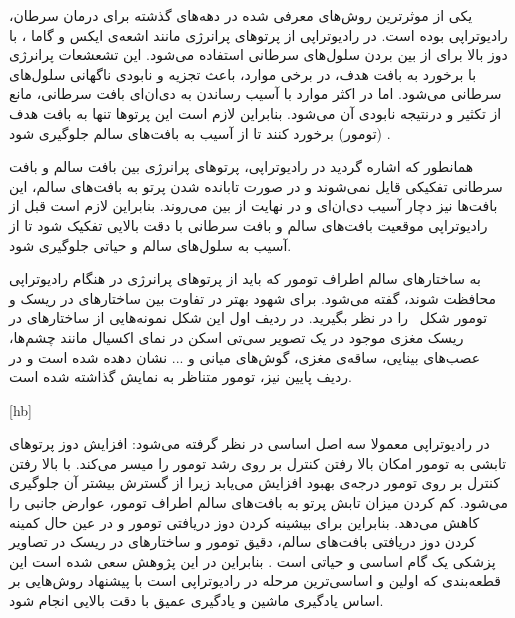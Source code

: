 

یکی از موثرترین روش‌های معرفی شده در دهه‌های گذشته برای درمان سرطان، رادیوتراپی	 بوده است. در رادیوتراپی از پرتوهای پرانرژی مانند اشعه‌ی ایکس	 و گاما	، با دوز	 بالا برای از بین بردن سلول‌های سرطانی استفاده می‌شود. این تشعشعات پرانرژی با برخورد به بافت هدف، در برخی موارد، باعث تجزیه و نابودی ناگهانی سلول‌های سرطانی می‌شود. اما در اکثر موارد با آسیب رساندن به دی‌ان‌ای	 بافت سرطانی، مانع از تکثیر و درنتیجه نابودی آن می‌شود. بنابراین لازم است این پرتوها تنها به بافت هدف (تومور) برخورد کنند تا از آسیب به بافت‌های سالم جلوگیری شود . 





همانطور که اشاره گردید در رادیوتراپی، پرتوهای پرانرژی بین بافت سالم و بافت سرطانی تفکیکی قایل نمی‌شوند و در صورت تابانده شدن پرتو به بافت‌های سالم، این بافت‌ها نیز دچار آسیب دی‌ان‌ای و در نهایت از بین می‌روند. بنابراین لازم است قبل از رادیوتراپی موقعیت بافت‌های سالم و بافت سرطانی با دقت بالایی تفکیک شود تا از آسیب به سلول‌های سالم و حیاتی جلوگیری شود.

به ساختارهای سالم اطراف تومور که باید از پرتوهای پرانرژی در هنگام رادیوتراپی محافظت شوند، گفته می‌شود. برای شهود بهتر در تفاوت بین ساختارهای در ریسک و تومور شکل‌~ را در نظر بگیرید. در ردیف اول این شکل نمونه‌هایی از ساختارهای در ریسک مغزی موجود در یک تصویر سی‌تی اسکن در نمای اکسیال مانند چشم‌ها، عصب‌های بینایی، ساقه‌ی مغزی، گوش‌های میانی و ... نشان دهده شده است و در ردیف پایین نیز، تومور متناظر به نمایش گذاشته شده است.

[hb]

در رادیوتراپی معمولا سه اصل اساسی در نظر گرفته می‌شود:
 افزایش دوز پرتوهای تابشی به تومور امکان بالا رفتن کنترل بر روی رشد تومور را میسر می‌کند.
 با بالا رفتن کنترل بر روی تومور درجه‌ی بهبود افزایش می‌یابد زیرا از گسترش بیشتر آن جلوگیری می‌شود.
 کم کردن میزان تابش پرتو به بافت‌های سالم اطراف تومور، عوارض جانبی را کاهش می‌دهد.
بنابراین برای بیشینه کردن دوز دریافتی تومور و در عین حال کمینه کردن دوز دریافتی بافت‌های سالم،  دقیق تومور و ساختارهای در ریسک در تصاویر پزشکی یک گام اساسی و حیاتی است . بنابراین در این پژوهش سعی شده است این قطعه‌بندی که اولین و اساسی‌ترین مرحله در رادیوتراپی است با پیشنهاد روش‌هایی بر اساس یادگیری ماشین و یادگیری عمیق با دقت بالایی انجام شود.
	

